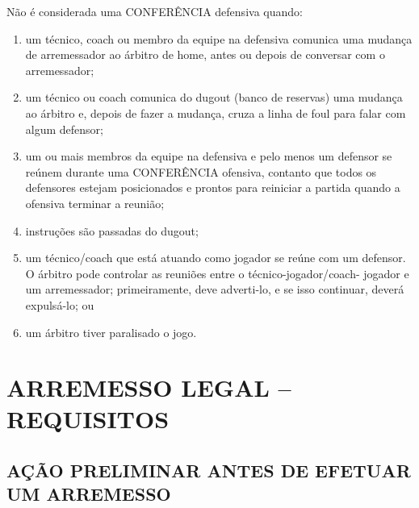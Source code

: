  Não é considerada uma CONFERÊNCIA defensiva quando:

\begin{enumerate}[label=(\alph*)]
	\item   um técnico, \gls{coach} ou membro da equipe na defensiva comunica uma  mudança de arremessador ao árbitro de \gls{home}, antes ou depois de conversar com o arremessador;
	\item  um técnico ou \gls{coach} comunica do \gls{dugout} (banco de reservas) uma mudança ao árbitro e, depois de fazer a mudança, cruza a linha de \gls{foul} para  falar com algum defensor;
	\item  um ou mais membros da equipe na defensiva e pelo menos um defensor se reúnem durante uma CONFERÊNCIA ofensiva, contanto que todos os
	 defensores estejam posicionados e prontos para reiniciar a partida quando a  ofensiva terminar a reunião;
	\item  instruções são passadas do \gls{dugout};
	\item  um técnico/\gls{coach} que está atuando como jogador se reúne com um defensor. O árbitro pode controlar as reuniões entre o técnico-jogador/\gls{coach}- jogador e um arremessador; primeiramente, deve adverti-lo, e se isso continuar, deverá expulsá-lo; ou
	\item  um árbitro tiver paralisado o jogo.
\end{enumerate}
\section{ARREMESSO LEGAL -- REQUISITOS}
\subsection{AÇÃO PRELIMINAR  ANTES  DE  EFETUAR  UM ARREMESSO}

